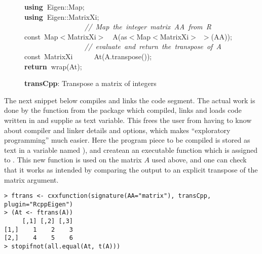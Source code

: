 \documentclass[shortnames,article]{jss}
\newcommand{\hlstd}[1]{\textcolor[rgb]{0,0,0}{#1}}
\newcommand{\hlslc}[1]{\textcolor[rgb]{0.67,0.13,0.13}{\it{#1}}}
\newcommand{\hlsym}[1]{\textcolor[rgb]{0,0,0}{#1}}
\newcommand{\hlkwa}[1]{\textcolor[rgb]{0.61,0.13,0.93}{\bf{#1}}}
\newcommand{\hlkwb}[1]{\textcolor[rgb]{0.13,0.54,0.13}{#1}}
\newcommand{\hlkwd}[1]{\textcolor[rgb]{0,0,0}{#1}}
\begin{document}
\begin{figure}[htb]
    \noindent
    \ttfamily
    \hlstd{}\hlkwa{using\ }\hlstd{Eigen}\hlsym{::}\hlstd{Map}\hlsym{;}\hspace*{\fill}\\
    \hlstd{}\hlkwa{using\ }\hlstd{Eigen}\hlsym{::}\hlstd{MatrixXi}\hlsym{;}\hspace*{\fill}\\
    \hlstd{}\hlstd{\ \ \ \ \ \ \ \ \ \ \ \ \ \ \ \ \ }\hlstd{}\hlslc{//\ Map\ the\ integer\ matrix\ AA\ from\ R}\hspace*{\fill}\\
    \hlstd{}\hlkwb{const\ }\hlstd{Map}\hlsym{$<$}\hlstd{MatrixXi}\hlsym{$>$}\hlstd{\ \ }\hlsym{}\hlstd{}\hlkwd{A}\hlstd{}\hlsym{(}\hlstd{as}\hlsym{$<$}\hlstd{Map}\hlsym{$<$}\hlstd{MatrixXi}\hlsym{$>$\ $>$(}\hlstd{AA}\hlsym{));}\hspace*{\fill}\\
    \hlstd{}\hlstd{\ \ \ \ \ \ \ \ \ \ \ \ \ \ \ \ \ }\hlstd{}\hlslc{//\ evaluate\ and\ return\ the\ transpose\ of\ A}\hspace*{\fill}\\
    \hlstd{}\hlkwb{const\ }\hlstd{MatrixXi}\hlstd{\ \ \ \ \ \ }\hlstd{}\hlkwd{At}\hlstd{}\hlsym{(}\hlstd{A}\hlsym{.}\hlstd{}\hlkwd{transpose}\hlstd{}\hlsym{());}\hspace*{\fill}\\
    \hlstd{}\hlkwa{return\ }\hlstd{}\hlkwd{wrap}\hlstd{}\hlsym{(}\hlstd{At}\hlsym{);}\hlstd{}\hspace*{\fill}
    \normalfont
  \caption{\textbf{transCpp}: Transpose a matrix of integers}
  \label{trans}
\end{figure}

The next  snippet below compiles and links the  code
segment. The actual work is done by the function  from the 
package which compiled, links and loads code written in  and
supplie as text variable.  This frees the user from having to know about
compiler and linker details and options, which makes ``exploratory
programming'' much easier.  Here the program piece to be compiled is stored
as text in a variable named ), and  createan
an executable function which is assigned to .  This new function
is used on the matrix $A$ used above, and one can check that it works as intended
by comparing the output to an explicit transpose of the matrix argument.
\begin{verbatim}
> ftrans <- cxxfunction(signature(AA="matrix"), transCpp, plugin="RcppEigen")
> (At <- ftrans(A))
     [,1] [,2] [,3]
[1,]    1    2    3
[2,]    4    5    6
> stopifnot(all.equal(At, t(A)))
\end{verbatim}
\end{document}
